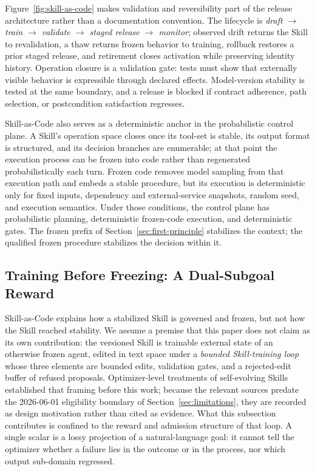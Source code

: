 Figure~\ref{fig:skill-as-code} makes validation and reversibility part of the release architecture rather than a documentation convention. The lifecycle is \textit{draft $\rightarrow$ train $\rightarrow$ validate $\rightarrow$ staged release $\rightarrow$ monitor}; observed drift returns the Skill to revalidation, a thaw returns frozen behavior to training, rollback restores a prior staged release, and retirement closes activation while preserving identity history. Operation closure is a validation gate: tests must show that externally visible behavior is expressible through declared effects. Model-version stability is tested at the same boundary, and a release is blocked if contract adherence, path selection, or postcondition satisfaction regresses.

Skill-as-Code also serves as a deterministic anchor in the probabilistic control plane. A Skill's operation space closes once its tool-set is stable, its output format is structured, and its decision branches are enumerable; at that point the execution process can be frozen into code rather than regenerated probabilistically each turn. Frozen code removes model sampling from that execution path and embeds a stable procedure, but its execution is deterministic only for fixed inputs, dependency and external-service snapshots, random seed, and execution semantics. Under those conditions, the control plane has probabilistic planning, deterministic frozen-code execution, and deterministic gates. The frozen prefix of Section~\ref{sec:first-principle} stabilizes the context; the qualified frozen procedure stabilizes the decision within it.

\subsection{Training Before Freezing: A Dual-Subgoal Reward}
\label{sec:training-before-freezing}

Skill-as-Code explains how a stabilized Skill is governed and frozen, but not how the Skill reached stability. We assume a premise that this paper does not claim as its own contribution: the versioned Skill is trainable external state of an otherwise frozen agent, edited in text space under a \textit{bounded Skill-training loop} whose three elements are bounded edits, validation gates, and a rejected-edit buffer of refused proposals. Optimizer-level treatments of self-evolving Skills established that framing before this work; because the relevant sources predate the 2026-06-01 eligibility boundary of Section~\ref{sec:limitations}, they are recorded as design motivation rather than cited as evidence. What this subsection contributes is confined to the reward and admission structure of that loop. A single scalar is a lossy projection of a natural-language goal: it cannot tell the optimizer whether a failure lies in the outcome or in the process, nor which output sub-domain regressed.

